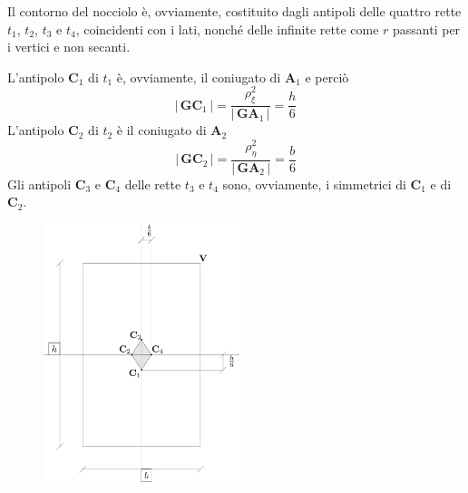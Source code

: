 \noindent Il contorno del nocciolo è, ovviamente, costituito dagli antipoli delle quattro rette $t_{1}$, $t_{2}$, $t_{3}$ e $t_{4}$, coincidenti con i lati, nonché delle infinite rette come $r$ passanti per i vertici e non secanti. 

\noindent L'antipolo $\mathbf{C}_{1}$ di $t_1$ è, ovviamente, il coniugato di $\mathbf{A}_{1}$ e perciò
\begin{equation*}
\lvert\,\mathbf{G}\mathbf{C}_{1}\,\lvert = \frac{\rho_{\xi}^{2}}{\lvert\,\mathbf{G}\mathbf{A}_{1}\,\lvert} = \frac{h}{6}
\end{equation*}
\noindent L'antipolo $\mathbf{C}_{2}$ di $t_2$ è il coniugato di $\mathbf{A}_{2}$ 
\begin{equation*}
\lvert\,\mathbf{G}\mathbf{C}_{2}\,\lvert = \frac{\rho_{\eta}^{2}}{\lvert\,\mathbf{G}\mathbf{A}_{2}\,\lvert} = \frac{b}{6}
\end{equation*}
\noindent Gli antipoli $\mathbf{C}_{3}$ e $\mathbf{C}_{4}$ delle rette $t_3$ e $t_4$ sono, ovviamente, i simmetrici di $\mathbf{C}_{1}$ e di $\mathbf{C}_{2}$.
\renewcommand{\thefigure}{6~-~8}
\begin{figure}[ht]
\centering
\includegraphics[width=0.51\textwidth]{Immagini/Parte_6/Figura6_8/Figura6_8.pdf}
\caption{}
\label{figura6-8}
\end{figure}
